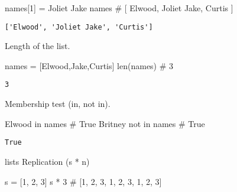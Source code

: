 \documentclass[
  letterpaper,
  DIV=11,
  numbers=noendperiod]{scrreprt}
\newenvironment{Shaded}{\begin{snugshade}}{\end{snugshade}}
\newcommand{\BuiltInTok}[1]{\textcolor[rgb]{0.00,0.46,0.62}{#1}}
\newcommand{\BuiltInTok}[1]{\textcolor[rgb]{0.00,0.48,0.65}{#1}}
\newcommand{\CommentTok}[1]{\textcolor[rgb]{0.37,0.37,0.37}{#1}}
\newcommand{\DecValTok}[1]{\textcolor[rgb]{0.68,0.00,0.00}{#1}}
\newcommand{\KeywordTok}[1]{\textcolor[rgb]{0.00,0.46,0.62}{#1}}
\newcommand{\NormalTok}[1]{\textcolor[rgb]{0.00,0.46,0.62}{#1}}
\newcommand{\OperatorTok}[1]{\textcolor[rgb]{0.37,0.37,0.37}{#1}}
\newcommand{\KeywordTok}[1]{\textcolor[rgb]{0.00,0.48,0.65}{#1}}
\newcommand{\NormalTok}[1]{\textcolor[rgb]{0.00,0.48,0.65}{#1}}
\newcommand{\OperatorTok}[1]{\textcolor[rgb]{0.37,0.37,0.37}{#1}}
\newcommand{\StringTok}[1]{\textcolor[rgb]{0.13,0.47,0.30}{#1}}
\begin{document}
\begin{Shaded}
\begin{Highlighting}[]
\begin{Shaded}
\begin{Highlighting}[]
\NormalTok{names[}\DecValTok{1}\NormalTok{] }\OperatorTok{=} \StringTok{\textquotesingle{}Joliet Jake\textquotesingle{}}
\NormalTok{names                     }\CommentTok{\# [ \textquotesingle{}Elwood\textquotesingle{}, \textquotesingle{}Joliet Jake\textquotesingle{}, \textquotesingle{}Curtis\textquotesingle{} ]}
\end{Highlighting}
\end{Shaded}

\begin{verbatim}
['Elwood', 'Joliet Jake', 'Curtis']
\end{verbatim}

Length of the list.

\begin{Shaded}
\begin{Highlighting}[]
\NormalTok{names }\OperatorTok{=}\NormalTok{ [}\StringTok{\textquotesingle{}Elwood\textquotesingle{}}\NormalTok{,}\StringTok{\textquotesingle{}Jake\textquotesingle{}}\NormalTok{,}\StringTok{\textquotesingle{}Curtis\textquotesingle{}}\NormalTok{]}
\BuiltInTok{len}\NormalTok{(names)  }\CommentTok{\# 3}
\end{Highlighting}
\end{Shaded}

\begin{verbatim}
3
\end{verbatim}

Membership test (in, not in).

\begin{Shaded}
\begin{Highlighting}[]
\CommentTok{\textquotesingle{}Elwood\textquotesingle{}} \KeywordTok{in}\NormalTok{ names       }\CommentTok{\# True}
\CommentTok{\textquotesingle{}Britney\textquotesingle{}} \KeywordTok{not} \KeywordTok{in}\NormalTok{ names  }\CommentTok{\# True}
\end{Highlighting}
\end{Shaded}

\begin{verbatim}
True
\end{verbatim}

lists Replication (s * n)

\begin{Shaded}
\begin{Highlighting}[]
\NormalTok{s }\OperatorTok{=}\NormalTok{ [}\DecValTok{1}\NormalTok{, }\DecValTok{2}\NormalTok{, }\DecValTok{3}\NormalTok{]}
\NormalTok{s }\OperatorTok{*} \DecValTok{3}   \CommentTok{\# [1, 2, 3, 1, 2, 3, 1, 2, 3]}
\end{Highlighting}
\end{Shaded}


\end{Highlighting}
\end{Shaded}
\end{document}
